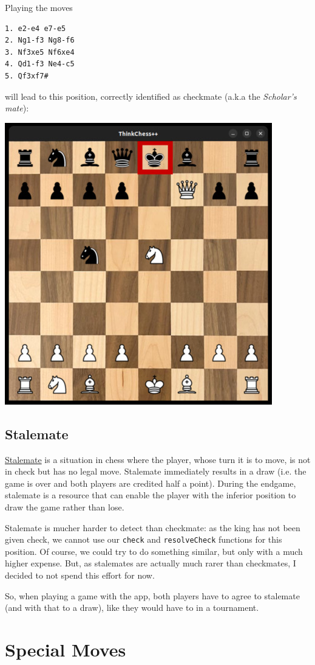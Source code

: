 Playing the moves
\begin{verbatim}
1. e2-e4 e7-e5
2. Ng1-f3 Ng8-f6
3. Nf3xe5 Nf6xe4
4. Qd1-f3 Ne4-c5
5. Qf3xf7#
\end{verbatim}

will lead to this position, correctly identified as checkmate (a.k.a
the \emph{Scholar's mate}):

\begin{center}
\includegraphics[width=.5\linewidth]{img/checkmate.jpg}
\end{center}

\subsection{Stalemate}

\href{https://en.wikipedia.org/wiki/Stalemate}{Stalemate} is a situation in chess where the player,
whose turn it is to move, is not in check but has no legal move.
Stalemate immediately results in a draw (i.e. the game is over and both players are credited half
a point).
During the endgame, stalemate is a resource that can enable the player with the inferior position
to draw the game rather than lose.

Stalemate is mucher harder to detect than checkmate: as the king has not been given check,
we cannot use our \texttt{check} and \texttt{resolveCheck} functions for this position.
Of course, we could try to do something similar, but only with a much higher expense.
But, as stalemates are actually much rarer than checkmates, I decided to not spend this effort for now.

So, when playing a game with the app, both players have to agree to stalemate (and with that to a draw),
like they would have to in a tournament.

\section{Special Moves}\label{sec:specmoves}

